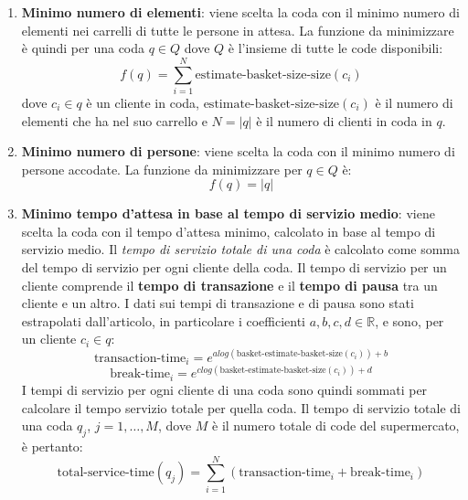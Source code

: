 \begin{enumerate}
\item \textbf{Minimo numero di elementi}: viene scelta la coda con il minimo numero di elementi nei carrelli di tutte le persone in attesa. La funzione da minimizzare è quindi per una coda $q \in Q$ dove $Q$ è l'insieme di tutte le code disponibili:
\begin{equation}
f(q) = \sum\limits_{i=1}^N \text{estimate-basket-size-size}(c_i) 
\end{equation}
dove $c_i \in q$ è un cliente in coda, $\text{estimate-basket-size-size}(c_i)$ è il numero di elementi che ha nel suo carrello e $N = |q|$ è il numero di clienti in coda in $q$.
\item \textbf{Minimo numero di persone}: viene scelta la coda con il minimo numero di persone accodate. La funzione da minimizzare per $q \in Q$ è:
\begin{equation}
f(q) = |q|
\end{equation}
\item \textbf{Minimo tempo d'attesa in base al tempo di servizio medio}:
viene scelta la coda con il tempo d'attesa minimo, calcolato in base al tempo di servizio medio.
Il \textit{tempo di servizio totale di una coda} è calcolato come somma del tempo di servizio per ogni cliente della coda. Il tempo di servizio per un cliente comprende il \textbf{tempo di transazione} e il \textbf{tempo di pausa} tra un cliente e un altro.  I dati sui tempi di transazione e di pausa sono stati estrapolati dall'articolo, in particolare i coefficienti $a,b,c,d \in \mathbb{R}$, e sono, per un cliente $c_i \in q$: 
\begin{equation}\label{eq:transaction-time}
\text{transaction-time}_i = e^{a log(\text{basket-estimate-basket-size}(c_i)) + b}
\end{equation}
\begin{equation}\label{eq:break-time}
\text{break-time}_i = e^{c log(\text{basket-estimate-basket-size}(c_i)) + d}
\end{equation}
I tempi di servizio per ogni cliente di una coda sono quindi sommati per calcolare il tempo servizio totale per quella coda. Il tempo di servizio totale di una coda $q_j$, $j = 1,\ldots ,M$, dove $M$ è il numero totale di code del supermercato, è pertanto:
\begin{equation}\label{eq:total-service-time}
\text{total-service-time}(q_j) = \sum\limits_{i=1}^N \left( \text{transaction-time}_i + \text{break-time}_i \right)
\end{equation}

\end{enumerate}

